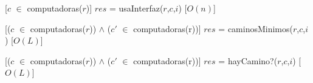   [$c$ $\in$ computadoras($r$)]
  {$res$ = usaInterfaz($r$,$c$,$i$)}
  [$O(n)$]

  [($c$ $\in$ computadoras($r$)) $\land$ ($c'$ $\in$ computadoras(r))]
  {$res$ = caminosMinimos($r$,$c$,$i$)}
  [$O(L)$]

  [($c$ $\in$ computadoras($r$)) $\land$ ($c'$ $\in$ computadoras(r))]
  {$res$ = hayCamino?($r$,$c$,$i$)}
  [$O(L)$]



